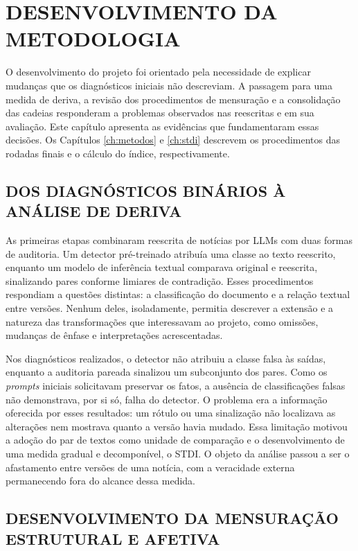 \chapter{DESENVOLVIMENTO DA METODOLOGIA}
\label{ch:evolucao}

O desenvolvimento do projeto foi orientado pela necessidade de explicar mudanças que os diagnósticos iniciais não descreviam. A passagem para uma medida de deriva, a revisão dos procedimentos de mensuração e a consolidação das cadeias responderam a problemas observados nas reescritas e em sua avaliação. Este capítulo apresenta as evidências que fundamentaram essas decisões. Os Capítulos \ref{ch:metodos} e \ref{ch:stdi} descrevem os procedimentos das rodadas finais e o cálculo do índice, respectivamente.

\section{DOS DIAGNÓSTICOS BINÁRIOS À ANÁLISE DE DERIVA}
\label{sec:diagnosticos-deriva}

As primeiras etapas combinaram reescrita de notícias por LLMs com duas formas de auditoria. Um detector pré-treinado atribuía uma classe ao texto reescrito, enquanto um modelo de inferência textual comparava original e reescrita, sinalizando pares conforme limiares de contradição. Esses procedimentos respondiam a questões distintas: a classificação do documento e a relação textual entre versões. Nenhum deles, isoladamente, permitia descrever a extensão e a natureza das transformações que interessavam ao projeto, como omissões, mudanças de ênfase e interpretações acrescentadas.

Nos diagnósticos realizados, o detector não atribuiu a classe falsa às saídas, enquanto a auditoria pareada sinalizou um subconjunto dos pares. Como os \textit{prompts} iniciais solicitavam preservar os fatos, a ausência de classificações falsas não demonstrava, por si só, falha do detector. O problema era a informação oferecida por esses resultados: um rótulo ou uma sinalização não localizava as alterações nem mostrava quanto a versão havia mudado. Essa limitação motivou a adoção do par de textos como unidade de comparação e o desenvolvimento de uma medida gradual e decomponível, o STDI. O objeto da análise passou a ser o afastamento entre versões de uma notícia, com a veracidade externa permanecendo fora do alcance dessa medida.

\section{DESENVOLVIMENTO DA MENSURAÇÃO ESTRUTURAL E AFETIVA}
\label{sec:desenvolvimento-stdi}

